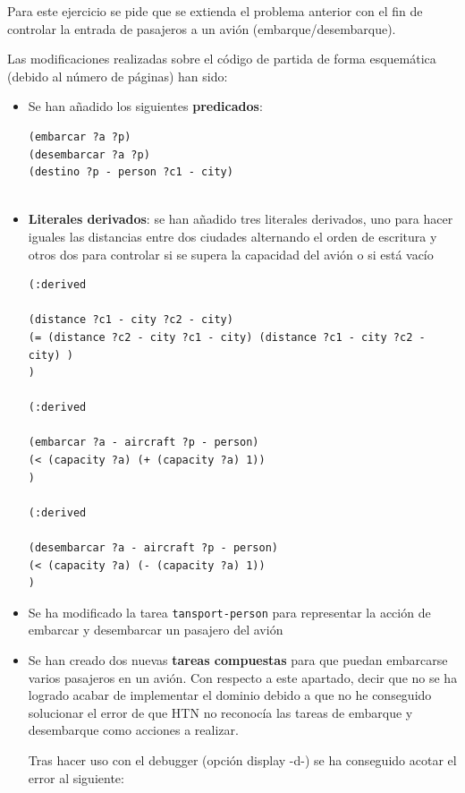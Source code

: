 Para este ejercicio se pide que se extienda el problema anterior con el fin de controlar la entrada de pasajeros a un avión (embarque/desembarque).

Las modificaciones realizadas sobre el código de partida de forma esquemática (debido al número de páginas) han sido:

\begin{itemize}
	\item Se han añadido los siguientes \textbf{predicados}:
	
	\begin{lstlisting}[language=SH]
(embarcar ?a ?p)
(desembarcar ?a ?p)
(destino ?p - person ?c1 - city)
	             
	 \end{lstlisting}
	
	\item \textbf{Literales derivados}: se han añadido tres literales derivados, uno para hacer iguales las distancias entre dos ciudades alternando el orden de escritura y otros dos para controlar si se supera la capacidad del avión o si está vacío
	
	\begin{lstlisting}[language=SH]
(:derived 

(distance ?c1 - city ?c2 - city)
(= (distance ?c2 - city ?c1 - city) (distance ?c1 - city ?c2 - city) )
)

(:derived 

(embarcar ?a - aircraft ?p - person)
(< (capacity ?a) (+ (capacity ?a) 1))
)

(:derived 

(desembarcar ?a - aircraft ?p - person)
(< (capacity ?a) (- (capacity ?a) 1))
)
		\end{lstlisting}
	
	\item Se ha modificado la tarea \texttt{tansport-person} para representar la acción de embarcar y desembarcar un pasajero del avión
	
		
	\item Se han creado dos nuevas \textbf{tareas compuestas} para que puedan embarcarse varios pasajeros en un avión. Con respecto a este apartado, decir que no se ha logrado acabar de implementar el dominio debido a que no he conseguido solucionar el error de que HTN no reconocía las tareas de embarque y desembarque como acciones a realizar. 
	
	Tras hacer uso con el debugger (opción display -d-) se ha conseguido acotar el error al siguiente:
	

\end{itemize}
